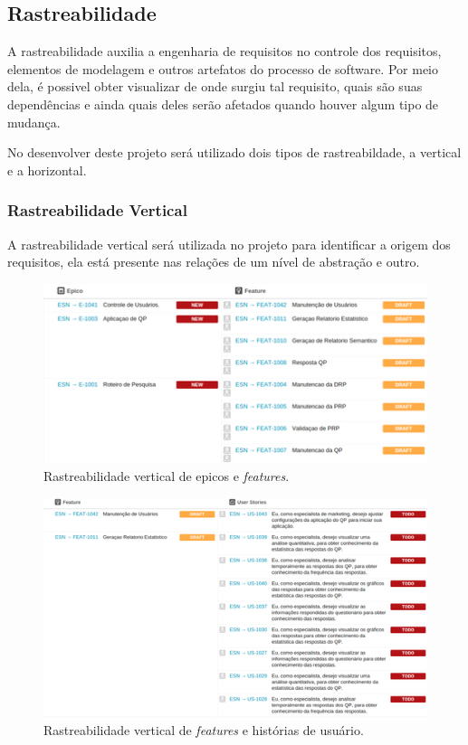 	\subsection{Rastreabilidade}

	A rastreabilidade auxilia a engenharia de requisitos no controle dos requisitos, elementos de modelagem e outros artefatos do processo de software. Por meio dela, é possivel obter visualizar de onde surgiu tal requisito, quais são suas dependências e ainda quais deles serão afetados quando houver algum tipo de mudança.

	No desenvolver deste projeto será utilizado dois tipos de rastreabildade, a vertical e a horizontal.
	
	\subsubsection{Rastreabilidade Vertical}
	A rastreabilidade vertical será utilizada no projeto para identificar a origem dos requisitos, ela está presente nas relações de um nível de abstração e outro.\\

		\begin{figure}[!htp]
			\centering
			\includegraphics{imagens/epicfeat.png}
			\caption{Rastreabilidade vertical de epicos e \textit{features}.}
			\label{imagem}
		\end{figure}

		\begin{figure}[!htp]
			\centering
			\includegraphics{imagens/featus.png}
			\caption{Rastreabilidade vertical de \textit{features} e histórias de usuário.}
			\label{imagem}
		\end{figure}

